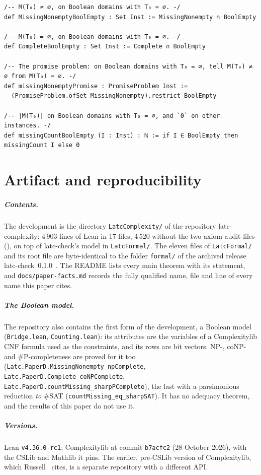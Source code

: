 \documentclass[pdflatex,sn-mathphys-num]{sn-jnl}
\theoremstyle{thmstyleone}
\theoremstyle{thmstylethree}
\begin{document}
\begin{appendices}
\begin{lstlisting}
/-- M(T₀) ≠ ∅, on Boolean domains with T₀ = ∅. -/
def MissingNonemptyBoolEmpty : Set Inst := MissingNonempty ∩ BoolEmpty

/-- M(T₀) = ∅, on Boolean domains with T₀ = ∅. -/
def CompleteBoolEmpty : Set Inst := Complete ∩ BoolEmpty

/-- The promise problem: on Boolean domains with T₀ = ∅, tell M(T₀) ≠ ∅ from M(T₀) = ∅. -/
def missingNonemptyPromise : PromiseProblem Inst :=
  (PromiseProblem.ofSet MissingNonempty).restrict BoolEmpty

/-- |M(T₀)| on Boolean domains with T₀ = ∅, and `0` on other instances. -/
def missingCountBoolEmpty (I : Inst) : ℕ := if I ∈ BoolEmpty then missingCount I else 0
\end{lstlisting}

\section{Artifact and reproducibility}
\label{app:artifact}

\subparagraph*{Contents.}
The development is the directory \texttt{LatcComplexity/} of the repository latc-complexity:
4\,903 lines of Lean in 17 files, 4\,520 without the two axiom-audit files
(), on top of latc-check's model in \texttt{LatcFormal/}. The eleven files of
\texttt{LatcFormal/} and its root file are byte-identical to the folder \texttt{formal/} of the
archived release latc-check~0.1.0~\cite{latc_check_0_1_0}. The README lists every main theorem
with its statement, and \texttt{docs/paper-facts.md} records the fully qualified name, file and
line of every name this paper cites.

\subparagraph*{The Boolean model.}
The repository also contains the first form of the development, a Boolean model
(\texttt{Bridge.lean}, \texttt{Counting.lean}): its attributes are the variables of a
Complexitylib CNF formula used as the constraints, and its rows are bit vectors. NP-, coNP- and
\#P-completeness are proved for it too (\lstinline{Latc.PaperD.MissingNonempty_npComplete},
\lstinline{Latc.PaperD.Complete_coNPComplete}, \lstinline{Latc.PaperD.countMissing_sharpPComplete}),
the last with a parsimonious reduction \emph{to} \#SAT (\lstinline{countMissing_eq_sharpSAT}).
It has no adequacy theorem, and the results of this paper do not use it.

\subparagraph*{Versions.}
Lean \texttt{v4.36.0-rc1}; Complexitylib at commit \texttt{b7acfc2} (28 October 2026), with the
CSLib and Mathlib it pins. The earlier, pre-CSLib version of Complexitylib, which
Russell~\cite{PaperA} cites, is a separate repository with a different API.


\end{appendices}
\end{document}
